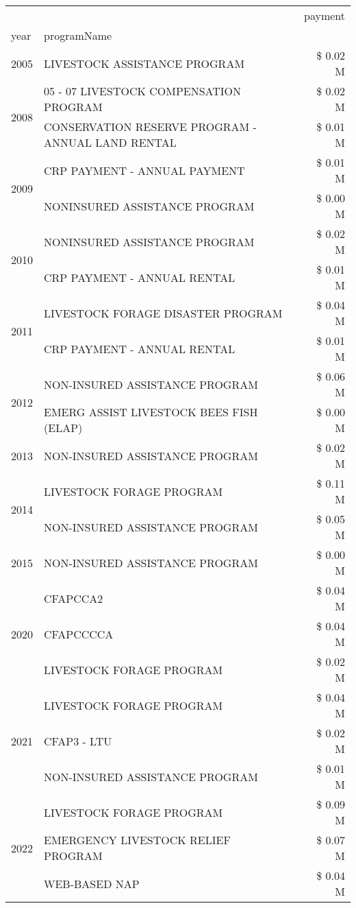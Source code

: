 \begin{tabular}{llr}
\toprule
 &  & payment \\
year & programName &  \\
\midrule
2005 & LIVESTOCK ASSISTANCE PROGRAM & \$ 0.02 M \\
\cline{1-3}
\multirow[t]{2}{*}{2008} & 05 - 07 LIVESTOCK COMPENSATION PROGRAM & \$ 0.02 M \\
 & CONSERVATION RESERVE PROGRAM - ANNUAL LAND RENTAL & \$ 0.01 M \\
\cline{1-3}
\multirow[t]{2}{*}{2009} & CRP PAYMENT - ANNUAL PAYMENT & \$ 0.01 M \\
 & NONINSURED ASSISTANCE PROGRAM & \$ 0.00 M \\
\cline{1-3}
\multirow[t]{2}{*}{2010} & NONINSURED ASSISTANCE PROGRAM & \$ 0.02 M \\
 & CRP PAYMENT - ANNUAL RENTAL & \$ 0.01 M \\
\cline{1-3}
\multirow[t]{2}{*}{2011} & LIVESTOCK FORAGE DISASTER PROGRAM & \$ 0.04 M \\
 & CRP PAYMENT - ANNUAL RENTAL & \$ 0.01 M \\
\cline{1-3}
\multirow[t]{2}{*}{2012} & NON-INSURED ASSISTANCE PROGRAM & \$ 0.06 M \\
 & EMERG ASSIST LIVESTOCK BEES FISH (ELAP) & \$ 0.00 M \\
\cline{1-3}
2013 & NON-INSURED ASSISTANCE PROGRAM & \$ 0.02 M \\
\cline{1-3}
\multirow[t]{2}{*}{2014} & LIVESTOCK FORAGE PROGRAM & \$ 0.11 M \\
 & NON-INSURED ASSISTANCE PROGRAM & \$ 0.05 M \\
\cline{1-3}
2015 & NON-INSURED ASSISTANCE PROGRAM & \$ 0.00 M \\
\cline{1-3}
\multirow[t]{3}{*}{2020} & CFAPCCA2 & \$ 0.04 M \\
 & CFAPCCCCA & \$ 0.04 M \\
 & LIVESTOCK FORAGE PROGRAM & \$ 0.02 M \\
\cline{1-3}
\multirow[t]{3}{*}{2021} & LIVESTOCK FORAGE PROGRAM & \$ 0.04 M \\
 & CFAP3 - LTU & \$ 0.02 M \\
 & NON-INSURED ASSISTANCE PROGRAM & \$ 0.01 M \\
\cline{1-3}
\multirow[t]{3}{*}{2022} & LIVESTOCK FORAGE PROGRAM & \$ 0.09 M \\
 & EMERGENCY LIVESTOCK RELIEF PROGRAM & \$ 0.07 M \\
 & WEB-BASED NAP & \$ 0.04 M \\
\cline{1-3}
\bottomrule
\end{tabular}
